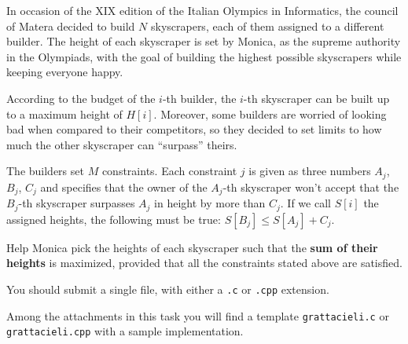 \usepackage{xcolor}
\usepackage{afterpage}
\usepackage{pifont,mdframed}
\usepackage[bottom]{footmisc}
\usepackage{caption}



\renewcommand{\inputfile}{\texttt{stdin}}
\renewcommand{\outputfile}{\texttt{stdout}}
\makeatletter
\renewcommand{\this@inputfilename}{\texttt{stdin}}
\renewcommand{\this@outputfilename}{\texttt{stdout}}
\makeatother


In occasion of the XIX edition of the Italian Olympics in Informatics, the
council of Matera decided to build $N$ skyscrapers, each of them assigned to a
different builder. The height of each skyscraper is set by Monica, as the
supreme authority in the Olympiads, with the goal of building the highest
possible skyscrapers while keeping everyone happy.

According to the budget of the $i$-th builder, the $i$-th skyscraper can be
built up to a maximum height of $H[i]$. Moreover, some builders are worried of
looking bad when compared to their competitors, so they decided to set limits to
how much the other skyscraper can ``surpass'' theirs.

The builders set $M$ constraints. Each constraint $j$ is given as three numbers
$A_j$, $B_j$, $C_j$ and specifies that the owner of the $A_j$-th skyscraper
won't accept that the $B_j$-th skyscraper surpasses $A_j$ in height by more than
$C_j$. If we call $S[i]$ the assigned heights, the following must be true:
$S[B_j] \leq S[A_j] + C_j$.

Help Monica pick the heights of each skyscraper such that the \textbf{sum of
their heights} is maximized, provided that all the constraints stated above are
satisfied.


\Implementation

You should submit a single file, with either a \texttt{.c} or \texttt{.cpp}
extension.

\begin{warning}
Among the attachments in this task you will find a template
\texttt{grattacieli.c} or \texttt{grattacieli.cpp} with a sample implementation.
\end{warning}

